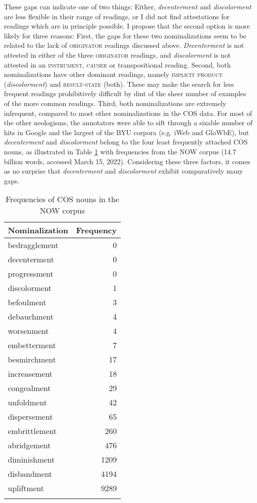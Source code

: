 These gaps can indicate one of two things: Either, \textit{decenterment} and \textit{discolorment} are less flexible in their range of readings, or I did not find attestations for readings which are in principle possible. I propose that the second option is more likely for three reasons:
First, the gaps for these two nominalizations seem to be related to the lack of \textsc{originator} readings discussed above. \textit{Decenterment} is not attested in either of the three \textsc{originator} readings, and \textit{discolorment} is not attested in an \textsc{instrument, causer} or transpositional reading.
Second, both nominalizations have other dominant readings, namely \textsc{implicit product} (\textit{discolorment}) and \textsc{result-state} (both). These may make the search for less frequent readings prohibitively difficult by dint of the sheer number of examples of the more common readings.\largerpage
Third, both nominalizations are extremely infrequent, compared to most other nominalizations in the COS data. 
For most of the other neologisms, the annotators were able to sift through a sizable number of hits in Google and the largest of the BYU corpora (e.g. iWeb and GloWbE), but \textit{decenterment} and \textit{discolorment} belong to the four least frequently attached COS nouns, as illustrated in Table \ref{tab:CosFrequencies} with frequencies from the NOW corpus (14.7 billion words, accessed March 15, 2022). 
Considering these three factors, it comes as no surprise that \textit{decenterment} and \textit{discolorment} exhibit comparatively many gaps.  

\begin{table}
	\caption[]{Frequencies of COS nouns in the NOW corpus} \label{tab:CosFrequencies}
	\begin{tabular}{lr}
		\lsptoprule
		Nominalization & Frequency \\
		\midrule
		bedragglement  & 0         \\
		decenterment   & 0         \\
		progressment   & 0         \\
		discolorment   & 1         \\
		befoulment     & 3         \\
		debauchment    & 4         \\
		worsenment     & 4         \\
		embetterment   & 7         \\
		besmirchment   & 17        \\
		increasement   & 18        \\
		congealment    & 29        \\
		unfoldment     & 42        \\
		dispersement   & 65        \\
		embrittlement  & 260       \\
		abridgement    & 476       \\
		diminishment   & 1209      \\
		disbandment    & 4194      \\
		upliftment     & 9289     \\
		\lspbottomrule
	\end{tabular}
\end{table}

